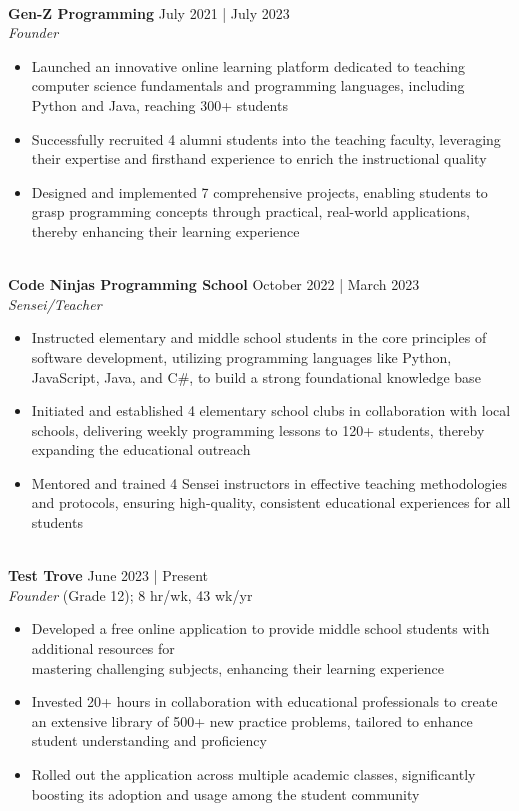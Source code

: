 \documentclass[a4paper,10pt]{extarticle}
\begin{document}
\noindent
\\ \textbf{Gen-Z Programming} \hfill July 2021 | July 2023 \\
\textit{Founder}
\begin{itemize}
    \item Launched an innovative online learning platform dedicated to teaching computer science fundamentals and programming languages, including Python and Java, reaching 300+ students
    \item Successfully recruited 4 alumni students into the teaching faculty, leveraging their expertise and firsthand experience to enrich the instructional quality
    \item Designed and implemented 7 comprehensive projects, enabling students to grasp programming concepts through practical, real-world applications, thereby enhancing their learning experience
\end{itemize}

\noindent
\\ \textbf{Code Ninjas Programming School} \hfill October 2022 | March 2023 \\
\textit{Sensei/Teacher}
\begin{itemize}
    \item Instructed elementary and middle school students in the core principles of software development, utilizing programming languages like Python, JavaScript, Java, and C\#, to build a strong foundational knowledge base
    \item Initiated and established 4 elementary school clubs in collaboration with local schools, delivering weekly programming lessons to 120+ students, thereby expanding the educational outreach
    \item Mentored and trained 4 Sensei instructors in effective teaching methodologies and protocols, ensuring high-quality, consistent educational experiences for all students
\end{itemize}

\noindent
\\ \textbf{Test Trove} \hfill June 2023 | Present \\
\textit{Founder} \hfill (Grade 12); 8 hr/wk, 43 wk/yr
\begin{itemize}
    \item Developed a free online application to provide middle school students with additional resources for \\ mastering challenging subjects, enhancing their learning experience
    \item Invested 20+ hours in collaboration with educational professionals to create an extensive library of 500+ new practice problems, tailored to enhance student understanding and proficiency
    \item Rolled out the application across multiple academic classes, significantly boosting its adoption and usage among the student community
\end{itemize}
\end{document}
